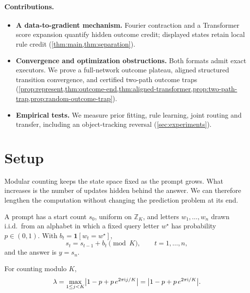 \paragraph{Contributions.}
\begin{itemize}[leftmargin=*,itemsep=3pt,topsep=3pt]
\item \textbf{A data-to-gradient mechanism.} Fourier contraction and a Transformer
score expansion quantify hidden outcome credit; displayed states retain local rule
credit (\cref{thm:main,thm:separation}).
\item \textbf{Convergence and optimization obstructions.} Both formats admit
exact executors. We prove a full-network outcome plateau, aligned structured
transition convergence, and certified two-path outcome traps
(\cref{prop:represent,thm:outcome-end,thm:aligned-transformer,prop:two-path-trap,prop:random-outcome-trap}).
\item \textbf{Empirical tests.} We measure prior fitting, rule learning, joint routing
and transfer, including an object-tracking reversal (\cref{sec:experiments}).
\end{itemize}

\section{Setup}
\label{sec:setup}
\label{sec:setting}

Modular counting keeps the state space fixed as the prompt grows. What increases is the number of updates hidden behind the
answer. We can therefore lengthen the computation without changing the prediction problem at its end.

\begin{definition}
\label{def:task}
A prompt has a start count $s_0$, uniform on $\mathbb Z_K$, and letters $w_1,\ldots,w_n$ drawn i.i.d.\ from an alphabet
in which a fixed query letter $w^\star$ has probability $p\in(0,1)$. With $b_t=\mathbf 1[w_t=w^\star]$,
\begin{equation}
 s_t=s_{t-1}+b_t\pmod K,\qquad t=1,\ldots,n,
 \label{eq:tracking}
\end{equation}
and the answer is $y=s_n$.
\end{definition}

\begin{definition}
\label{def:lambda}
For counting modulo $K$,
\begin{equation}
 \lambda=\max_{1\le j<K}\bigl|1-p+p\,e^{2\pi\mathrm ij/K}\bigr|=\bigl|1-p+p\,e^{2\pi\mathrm i/K}\bigr|.
 \label{eq:lambda}
\end{equation}
\end{definition}

